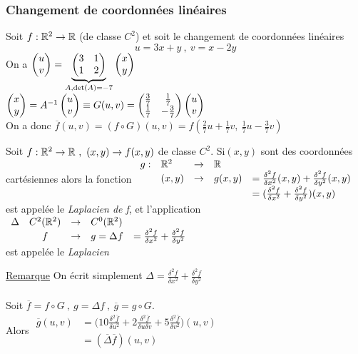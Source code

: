 \documentclass[12pt,a4paper]{article}
\begin{document}
\subsubsection{Changement de coordonnées linéaires}
 Soit $f: \mathbb{R}^2 \to \mathbb{R}$ (de classe $C^2$) et soit le changement de coordonnées linéaires
\begin{equation*}
u = 3x+y \ , \ v = x-2y
\end{equation*}
On a $\begin{pmatrix} u \\ v \end{pmatrix} = 
\underbrace{\begin{pmatrix}
	3 & 1\\
	1 & 2
\end{pmatrix}}_{A, \det(A) = -7}
\begin{pmatrix} x \\ y \end{pmatrix}$\\
$\begin{pmatrix} x \\ y \end{pmatrix} = A^{-1} \begin{pmatrix} u \\ v \end{pmatrix} \equiv G(u,v) = 
\begin{pmatrix}
	\frac{3}{7} & \frac{1}{7}\\
	\frac{1}{7} & -\frac{3}{7}
\end{pmatrix} \begin{pmatrix} u \\ v \end{pmatrix}$\\
On a donc $\overline{f}(u,v) = (f\circ G)(u,v)  = f(\frac{2}{7}u + \frac{1}{7}v,\ \frac{1}{7}u-\frac{3}{7}v)$
\begin{boite}
	 Soit $f:\mathbb{R}^2 \to \mathbb{R} \ , \ (x,y) \to f(x,y)$ de classe $C^2$. Si$(x,y) $ sont des coordonnées cartésiennes alors la fonction
	$\begin{array}{lllll}
		g: & \mathbb{R}^2 & \to  & \mathbb{R}\\
		& (x,y) & \to & g(x,y) & = \frac{\delta^2 f}{\delta x^2}(x,y) + \frac{\delta^2 f}{\delta y^2}(x,y)\\
		&&&& = (\frac{\delta^2 f}{\delta x^2} + \frac{\delta^2 f}{\delta y^2}) (x,y)
	\end{array}	$ \\
	est appelée le \textit{Laplacien de f}, et l'application \\
	$\begin{array}{rclll}
	\Delta & C^2 (\mathbb{R}^2) & \to & C^0(\mathbb{R}^2)\\
	& f & \to & g=\Delta f & = \frac{\delta^2 f}{\delta x^2} + \frac{\delta^2 f}{\delta y^2}
	\end{array}$\\
	est appelée le \textit{Laplacien}
\end{boite} 
\uline{Remarque} On écrit simplement $\Delta = \frac{\delta^2 f}{\delta x^2}+ \frac{\delta^2 f}{\delta y^2}$\\
\\
Soit $\overline{f} = f \circ G \ , \ g=\Delta f \ , \ \overline{g} = g \circ G$. \\
Alors $\begin{array}{rl}
\overline{g}(u,v) &= \big(10 \frac{\delta^2 \overline{f}}{\delta u^2} + 2 \frac{\delta^2 \overline{f}}{\delta u \delta v} + 5\frac{\delta^2 \overline{f}}{\delta v^2}\big)(u,v)\\
& = (\overline{\Delta}\overline{f})(u,v)
\end{array}$
\end{document}
